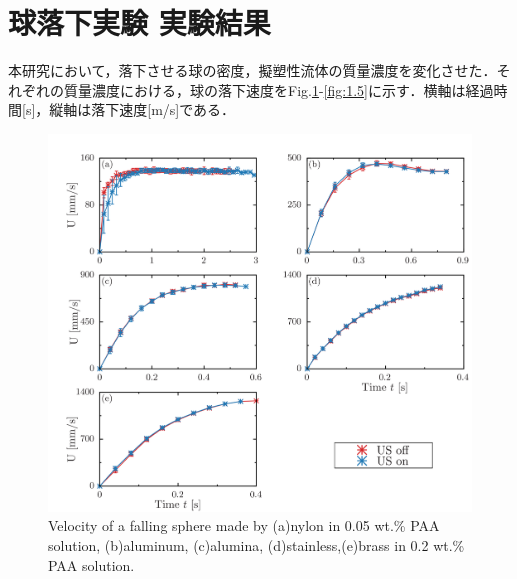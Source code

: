 \section{球落下実験 実験結果}
\label{sec:expData}

本研究において，落下させる球の密度，擬塑性流体の質量濃度を変化させた．それぞれの質量濃度における，球の落下速度をFig.\ref{fig:0.05-0.2}-\ref{fig:1.5}に示す．横軸は経過時間[s]，縦軸は落下速度[m/s]である．

\begin{figure}[h]
    \centering
    \includegraphics[width=15.0cm,clip]{5-Results/result_data/0.05-0.2.png}
    \caption{Velocity of a falling sphere made by (a)nylon in 0.05 wt.\% PAA solution, (b)aluminum, (c)alumina, (d)stainless,(e)brass in 0.2 wt.\% PAA solution.}
    \label{fig:0.05-0.2}
\end{figure}

